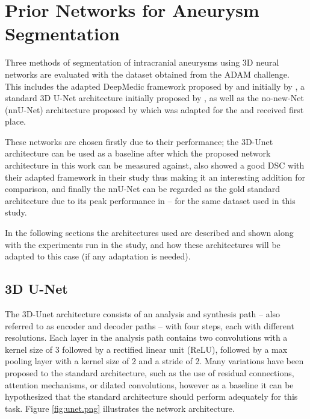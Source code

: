 \chapter{Prior Networks for Aneurysm Segmentation}
\label{chapter4}

Three methods of segmentation of intracranial aneurysms using 3D neural networks are evaluated with the dataset obtained from the ADAM challenge. This includes the adapted DeepMedic framework proposed by \citeauthor{Sichermann2019} and initially by \citeauthor{Kamnitsas2017}, a standard 3D U-Net architecture initially proposed by \citeauthor{3dunet}, as well as the no-new-Net (nnU-Net) architecture proposed by \citeauthor{nnUnet} which was adapted for the  and received first place. 

These networks are chosen firstly due to their performance; the 3D-Unet architecture can be used as a baseline after which the proposed network architecture in this work can be measured against, \citeauthor{Sichermann2019} also showed a good DSC with their adapted framework in their study thus making it an interesting addition for comparison, and finally the nnU-Net can be regarded as the gold standard architecture due to its peak performance in  -- for the same dataset used in this study.

In the following sections the architectures used are described and shown along with the experiments run in the study, and how these architectures will be adapted to this case (if any adaptation is needed). 

\section{3D U-Net}
The 3D-Unet architecture consists of an analysis and synthesis path -- also referred to as encoder and decoder paths -- with four steps, each with different resolutions. Each layer in the analysis path contains two convolutions with a kernel size of 3 followed by a rectified linear unit (ReLU), followed by a max pooling layer with a kernel size of 2 and a stride of 2. Many variations have been proposed to the standard architecture, such as the use of residual connections, attention mechanisms, or dilated convolutions, however as a baseline it can be hypothesized that the standard architecture should perform adequately for this task. Figure \ref{fig:unet.png} illustrates the network architecture.

